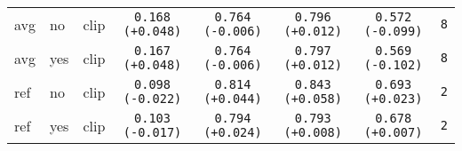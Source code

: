 \begin{tabular}{|l|l|l|c|c|c|c|c|}
avg & no & clip & \texttt{0.168} {\color{green}\texttt{(+0.048)}} & \texttt{0.764} {\color{green}\texttt{(-0.006)}} & \texttt{0.796} {\color{red}\texttt{(+0.012)}} & \texttt{0.572} {\color{red}\texttt{(-0.099)}} & \texttt{8}\\
avg & yes & clip & \texttt{0.167} {\color{green}\texttt{(+0.048)}} & \texttt{0.764} {\color{green}\texttt{(-0.006)}} & \texttt{0.797} {\color{red}\texttt{(+0.012)}} & \texttt{0.569} {\color{red}\texttt{(-0.102)}} & \texttt{8}\\
ref & no & clip & \texttt{0.098} {\color{red}\texttt{(-0.022)}} & \texttt{0.814} {\color{red}\texttt{(+0.044)}} & \texttt{0.843} {\color{red}\texttt{(+0.058)}} & \texttt{0.693} {\color{green}\texttt{(+0.023)}} & \texttt{2}\\
ref & yes & clip & \texttt{0.103} {\color{red}\texttt{(-0.017)}} & \texttt{0.794} {\color{red}\texttt{(+0.024)}} & \texttt{0.793} {\color{red}\texttt{(+0.008)}} & \texttt{0.678} {\color{green}\texttt{(+0.007)}} & \texttt{2}\\
\hline
\end{tabular}